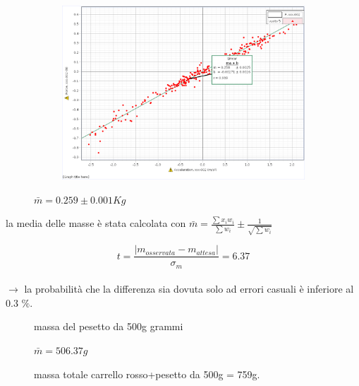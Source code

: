 \documentclass[a4paper]{article}
\theoremstyle{definition}
\begin{document}
\begin{figure}[!htbp]
{{			\begin{subfigure}{0.9\textwidth}
			\includegraphics[scale=0.45]{capstone_data/vuoto5.png}
			\end{subfigure}%
		}
	}
\end{figure}


\begin{figure}[!htbp]
	\captionsetup{labelformat=empty}
	\caption{}
	\caption{\(\bar{m} = 0.259 \pm 0.001 Kg\)}
	
\end{figure}
la media delle masse è stata calcolata con \(\bar{m} = \frac{\sum x_{i}w_{i}}{\sum w_{i}} \pm \frac{1}{\sqrt{\sum w_{i}}}\)

\[t = \frac{\left | m_{osservata} - m_{attesa} \right |}{\sigma_{m}}= 6.37\]\\
\noindent \(\rightarrow\) la probabilità che la differenza sia dovuta solo ad errori casuali è inferiore al 0.3 \(\%\).
	
\begin{figure}[!htbp]
	\captionsetup{labelformat=empty}
	\caption{massa del pesetto da 500g grammi}
	\caption{\(\bar{m} = 506.37 g\)}
	\caption{massa totale carrello rosso+pesetto da 500g = 759g.}
\end{figure}
\end{document}

